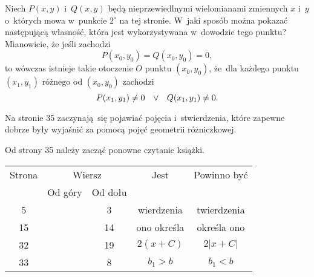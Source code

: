 \documentclass[a4paper,11pt]{article}
\numberwithin{equation}{section}
\begin{document}
\VerSpaceFour





\noindent
{} Niech $P( x, y )$ i~$Q( x, y )$ będą nieprzewiedlnymi wielomianami
zmiennych $x$ i~$y$ o~których mowa w~punkcie $2^{ \circ }$ na tej stronie.
W~jaki sposób można pokazać następującą własność, która jest wykorzystywana
w~dowodzie tego punktu? Mianowicie, że jeśli zachodzi
\begin{equation}
  \label{eq:Matwiejew-Metody-calkowania-ETC-89}
  P( x_{ 0 }, y_{ 0 } ) = Q( x_{ 0 }, y_{ 0 } ) = 0,
\end{equation}
to wówczas istnieje takie otoczenie $O$ punktu $( x_{ 0 }, y_{ 0 } )$,
że~dla każdego punktu $( x_{ 1 }, y_{ 1 } )$ różnego od $( x_{ 0 }, y_{ 0 } )$
zachodzi
\begin{equation}
  P( x_{ 1 }, y_{ 1 } ) \neq 0 \hspace{0.75em}
  \vee \hspace{0.75em}
  Q( x_{ 1 }, y_{ 1 } ) \neq 0.
\end{equation}

\VerSpaceFour





\noindent
{} Na stronie 35 zaczynają~się pojawiać pojęcia
i~stwierdzenia, które zapewne dobrze były wyjaśnić za pomocą pojęć geometrii
różniczkowej.

{\Large Od strony 35 należy zacząć ponowne czytanie książki.}























\newpage



\begin{center}

  \begin{tabular}{|c|c|c|c|c|}
    \hline
    Strona & \multicolumn{2}{c|}{Wiersz} & Jest
                              & Powinno być \\ \cline{2-3}
    & Od góry & Od dołu & & \\
    \hline
    5   & &  3 & wierdzenia & twierdzenia \\
    15  & & 14 & ono określa & określa ono \\
    32  & & 19 & $2 ( x + C )$ & $2 | x + C |$ \\
    33  & &  8 & $b_{ 1 } > b$ & $b_{ 1 } < b$ \\
    \hline
  \end{tabular}

\end{center}
\end{document}

